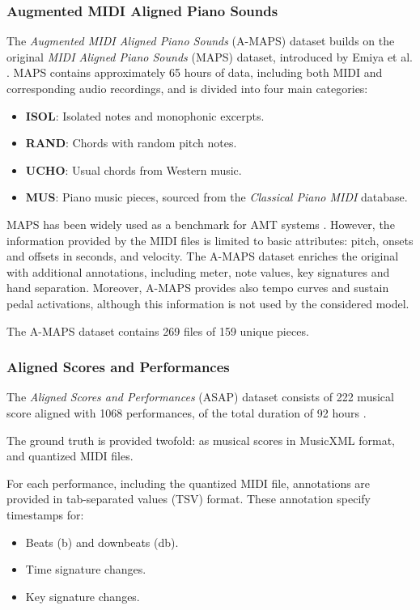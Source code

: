 \subsubsection{Augmented MIDI Aligned Piano Sounds}

The \emph{Augmented MIDI Aligned Piano Sounds} (A-MAPS) dataset builds on the original \emph{MIDI Aligned Piano Sounds} (MAPS) dataset, introduced by Emiya et al. \cite{Emiya2010}. MAPS contains approximately 65 hours of data, including both MIDI and corresponding audio recordings, and is divided into four main categories:\begin{itemize}
	\item \textbf{ISOL}: Isolated notes and monophonic excerpts.
	\item \textbf{RAND}: Chords with random pitch notes.
	\item \textbf{UCHO}: Usual chords from Western music.
	\item \textbf{MUS}: Piano music pieces, sourced from the \emph{Classical Piano MIDI} database. \end{itemize}

MAPS has been widely used as a benchmark for AMT systems \cite{Ycart2018}. However, the information provided by the MIDI files is limited to basic attributes: pitch, onsets and offsets in seconds, and velocity. The A-MAPS dataset enriches the original with additional annotations, including meter, note values, key signatures and hand separation. Moreover, A-MAPS provides also tempo curves and sustain pedal activations, although this information is not used by the considered model.

The A-MAPS dataset contains 269 files of 159 unique pieces.

\subsubsection{Aligned Scores and Performances}

The \emph{Aligned Scores and Performances} (ASAP) dataset consists of 222 musical score aligned with 1068 performances, of the total duration of 92 hours \cite{Foscarin2020}.

The ground truth is provided twofold: as musical scores in MusicXML format, and quantized MIDI files.

For each performance, including the quantized MIDI file, annotations are provided in tab-separated values (TSV) format. These annotation specify timestamps for: \begin{itemize}
	\item Beats (b) and downbeats (db).
	\item Time signature changes.
	\item Key signature changes.
\end{itemize}

